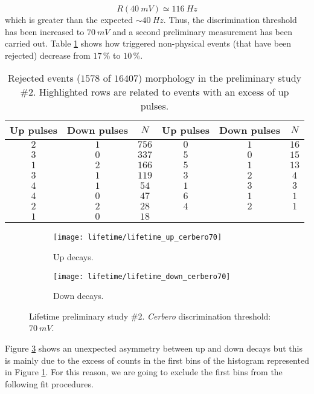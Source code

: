 \begin{equation}
	R\left(\SI{40}{mV}\right) \simeq \SI{116}{Hz}
\end{equation}
which is greater than the expected $\sim\SI{40}{Hz}$.
Thus, the discrimination threshold has been increased to $\SI{70}{mV}$ and a second preliminary measurement has been carried out. Table \ref{tab:skim2} shows how triggered non-physical events (that have been rejected) decrease from $17\,\%$ to $10\,\%$.
\begin{table}[!h]
	\centering
	\begin{tabular}{ccc||ccc}
		\toprule
		Up pulses & Down pulses & $N$ & Up pulses & Down pulses & $N$\\
		\midrule
		\cellcolor{blue!25}$2$&\cellcolor{blue!25}$1$&\cellcolor{blue!25}$756$ & $0$&$1$&$16$\\
		\rowcolor{blue!25}$3$&$0$&$337$ & $5$&$0$&$15$  \\
		$1$&$2$&$166$ & \cellcolor{blue!25}$5$&\cellcolor{blue!25}$1$&\cellcolor{blue!25}$13$  \\
		\rowcolor{blue!25}$3$&$1$&$119$ & $3$&$2$&$4$  \\
		\cellcolor{blue!25}$4$&\cellcolor{blue!25}$1$&\cellcolor{blue!25}$54$ & $1$&$3$&$3$\\
		\rowcolor{blue!25}$4$&$0$&$47$ & $6$&$1$&$1$\\
		\rowcolor{blue!25}$2$&$2$&$28$ & $4$&$2$&$1$\\
		$1$&$0$&$18$ &&&\\
		\bottomrule		
	\end{tabular}
	\caption{Rejected events ($1578$ of $16407$) morphology in the preliminary study \#2. Highlighted rows are related to events with an excess of up pulses.}\label{tab:skim2}
\end{table}
\begin{figure}[!htp]
	\centering
	\begin{subfigure}{.5\linewidth}
		\centering
		\texttt{[image: lifetime/lifetime\_up\_cerbero70]}
		\caption{Up decays.}\label{subfig:lt2up}
	\end{subfigure}
	\begin{subfigure}{.5\linewidth}
		\centering
		\texttt{[image: lifetime/lifetime\_down\_cerbero70]}
		\caption{Down decays.}\label{subfig:lt2down}
	\end{subfigure}
	\caption{Lifetime preliminary study \#2. \emph{Cerbero} discrimination threshold: $\SI{70}{mV}$.}\label{fig:lt2}
\end{figure}
Figure \ref{fig:lt2} shows an unexpected asymmetry between up and down decays but this is mainly due to the excess of counts in the first bins of the histogram represented in Figure \ref{subfig:lt2up}. For this reason, we are going to exclude the first bins from the following fit procedures.
